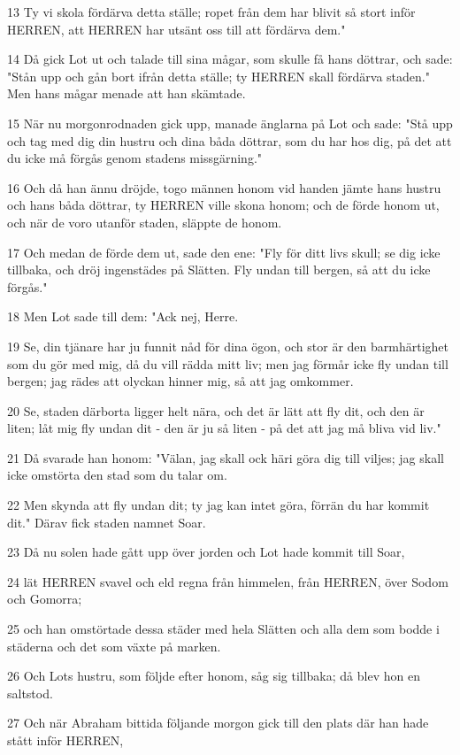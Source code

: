 \par 13 Ty vi skola fördärva detta ställe; ropet från dem har blivit så stort inför HERREN, att HERREN har utsänt oss till att fördärva dem."
\par 14 Då gick Lot ut och talade till sina mågar, som skulle få hans döttrar, och sade: "Stån upp och gån bort ifrån detta ställe; ty HERREN skall fördärva staden." Men hans mågar menade att han skämtade.
\par 15 När nu morgonrodnaden gick upp, manade änglarna på Lot och sade: "Stå upp och tag med dig din hustru och dina båda döttrar, som du har hos dig, på det att du icke må förgås genom stadens missgärning."
\par 16 Och då han ännu dröjde, togo männen honom vid handen jämte hans hustru och hans båda döttrar, ty HERREN ville skona honom; och de förde honom ut, och när de voro utanför staden, släppte de honom.
\par 17 Och medan de förde dem ut, sade den ene: "Fly för ditt livs skull; se dig icke tillbaka, och dröj ingenstädes på Slätten. Fly undan till bergen, så att du icke förgås."
\par 18 Men Lot sade till dem: "Ack nej, Herre.
\par 19 Se, din tjänare har ju funnit nåd för dina ögon, och stor är den barmhärtighet som du gör med mig, då du vill rädda mitt liv; men jag förmår icke fly undan till bergen; jag rädes att olyckan hinner mig, så att jag omkommer.
\par 20 Se, staden därborta ligger helt nära, och det är lätt att fly dit, och den är liten; låt mig fly undan dit - den är ju så liten - på det att jag må bliva vid liv."
\par 21 Då svarade han honom: "Välan, jag skall ock häri göra dig till viljes; jag skall icke omstörta den stad som du talar om.
\par 22 Men skynda att fly undan dit; ty jag kan intet göra, förrän du har kommit dit." Därav fick staden namnet Soar.
\par 23 Då nu solen hade gått upp över jorden och Lot hade kommit till Soar,
\par 24 lät HERREN svavel och eld regna från himmelen, från HERREN, över Sodom och Gomorra;
\par 25 och han omstörtade dessa städer med hela Slätten och alla dem som bodde i städerna och det som växte på marken.
\par 26 Och Lots hustru, som följde efter honom, såg sig tillbaka; då blev hon en saltstod.
\par 27 Och när Abraham bittida följande morgon gick till den plats där han hade stått inför HERREN,

